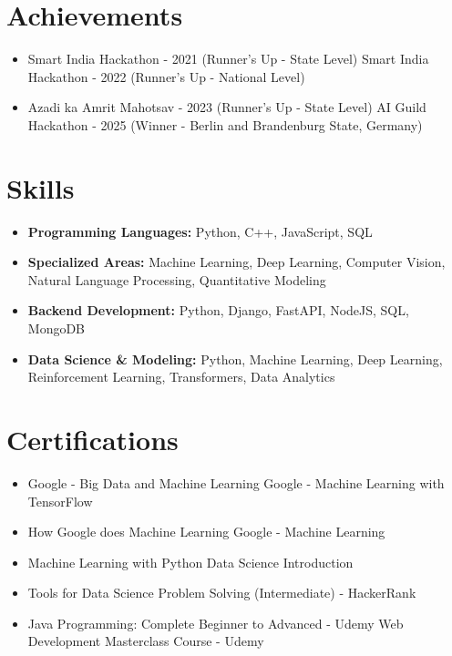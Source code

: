 \documentclass[a4paper,10pt]{article}
\begin{document}
\section*{Achievements}
\begin{itemize}
\item Smart India Hackathon - 2021 (Runner's Up - State Level) \hfill Smart India Hackathon - 2022 (Runner's Up - National Level)
\item Azadi ka Amrit Mahotsav - 2023 (Runner's Up - State Level) \hfill AI Guild Hackathon - 2025 (Winner - Berlin and Brandenburg State, Germany)
\end{itemize}

\section*{Skills}
\begin{itemize}
  \item \textbf{Programming Languages:} Python, C++, JavaScript, SQL
  \item \textbf{Specialized Areas:} Machine Learning, Deep Learning, Computer Vision, Natural Language Processing, Quantitative Modeling
  \item \textbf{Backend Development:} Python, Django, FastAPI, NodeJS, SQL, MongoDB
  \item \textbf{Data Science \& Modeling:} Python, Machine Learning, Deep Learning, Reinforcement Learning, Transformers, Data Analytics
\end{itemize}

\section*{Certifications}
\begin{itemize}
\item Google - Big Data and Machine Learning \hfill Google - Machine Learning with TensorFlow
\item How Google does Machine Learning \hfill Google - Machine Learning
\item Machine Learning with Python \hfill Data Science Introduction
\item Tools for Data Science \hfill Problem Solving (Intermediate) - HackerRank
\item Java Programming: Complete Beginner to Advanced - Udemy \hfill Web Development Masterclass Course - Udemy
\end{itemize}
\end{document}
